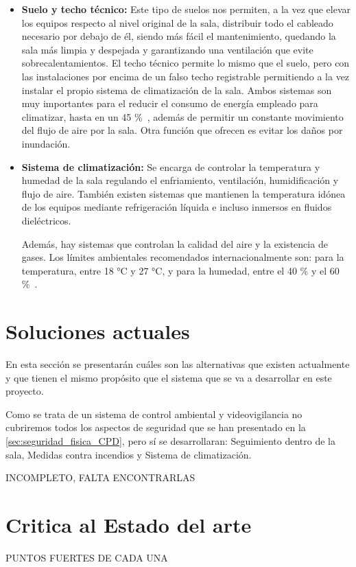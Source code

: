 \begin{itemize}
	\item \textbf{Suelo y techo técnico:} Este tipo de suelos nos permiten, a la vez que elevar los equipos respecto al nivel original de la sala, distribuir todo el cableado necesario por debajo de él, siendo más fácil el mantenimiento, quedando la sala más limpia y despejada y garantizando una ventilación que evite sobrecalentamientos. El techo técnico permite lo mismo que el suelo, pero con las instalaciones por encima de un falso techo registrable permitiendo a la vez instalar el propio sistema de climatización de la sala. Ambos sistemas son muy importantes para el reducir el consumo de energía empleado para climatizar, hasta en un 45 \%~\cite{noauthor_suelo_2020}, además de permitir un constante movimiento del flujo de aire por la sala. Otra función que ofrecen es evitar los daños por inundación.
	\item \textbf{Sistema de climatización:} Se encarga de controlar la temperatura y humedad de la sala regulando el enfriamiento, ventilación, humidificación y flujo de aire. También existen sistemas que mantienen la temperatura idónea de los equipos mediante refrigeración líquida e incluso inmersos en fluidos dieléctricos.
	
	Además, hay sistemas que controlan la calidad del aire y la existencia de gases. Los límites ambientales recomendados internacionalmente son: para la temperatura, entre 18 °C y 27 °C, y para la humedad, entre el 40 \% y el 60 \%~\cite{noauthor_recommended_nodate}.
\end{itemize}

\section{Soluciones actuales}\label{sec:soluciones-actuales}
En esta sección se presentarán cuáles son las alternativas que existen actualmente y que tienen el mismo propósito que el sistema que se va a desarrollar en este proyecto.

Como se trata de un sistema de control ambiental y videovigilancia no cubriremos todos los aspectos de seguridad que se han presentado en la \autoref{sec:seguridad_fisica_CPD}, pero sí se desarrollaran: Seguimiento dentro de la sala, Medidas contra incendios y Sistema de climatización.

INCOMPLETO, FALTA ENCONTRARLAS

\section{Critica al Estado del arte}\label{sec:critica-al-estado-del-arte}
PUNTOS FUERTES DE CADA UNA

